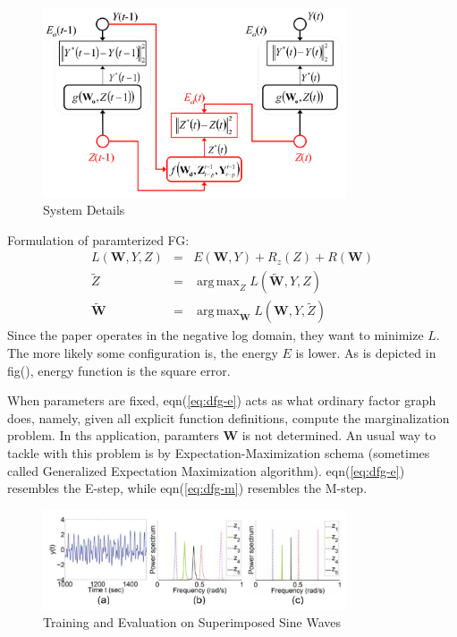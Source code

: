 \documentclass[11pt,a4paper]{article}
\DeclareMathOperator*{\argmax}{arg\,max}
\begin{document}
\begin{figure}[htb]
\centering
	\includegraphics[width=0.8\textwidth]{fig/mirowski2009-detail.png}
	\caption{System Details}
\end{figure}

Formulation of paramterized FG:
\begin{eqnarray}
	L(\mathbf{W}, Y, Z) &=& E(\mathbf{W}, Y) + R_z(Z) + R(\mathbf{W}) \\
	\tilde{Z} &=& \argmax_{Z} L(\tilde{\mathbf{W}}, Y, Z) \label{eq:dfg-e}\\
	\tilde{\mathbf{W}} &=& \argmax_{\mathbf{W}} L(\mathbf{W}, Y, \tilde{Z})
	\label{eq:dfg-m}
\end{eqnarray}
Since the paper operates in the negative log domain, they want to minimize
$L$. The more likely some configuration is, the energy $E$ is lower. As is 
depicted in fig(), energy function is the square error. 

When parameters are fixed, eqn(\ref{eq:dfg-e}) acts as what ordinary 
factor graph does, namely, given all explicit function definitions, 
compute the marginalization problem. In ths application, paramters $\mathbf{W}$
is not determined. An usual way to tackle with this problem is 
by Expectation-Maximization schema (sometimes called Generalized Expectation 
Maximization algorithm). eqn(\ref{eq:dfg-e}) resembles the E-step, while 
eqn(\ref{eq:dfg-m}) resembles the M-step. 

\begin{figure}[htb]
\centering
	\includegraphics[width=0.8\textwidth]{fig/mirowski2009-sine.png}
	\caption{Training and Evaluation on Superimposed Sine Waves}
\end{figure}
\end{document}
